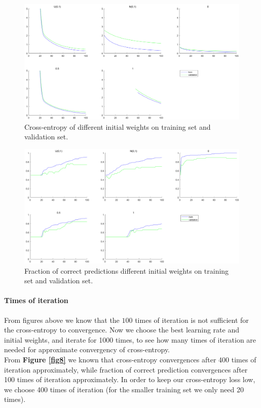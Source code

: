 \documentclass{article}
\begin{document}
\begin{figure}[H]
	\centering
	\includegraphics[scale=0.4]{figure6}
	\caption{Cross-entropy of different initial weights on training set and validation set.}
	\label{fig6}
\end{figure}

\begin{figure}[H]
	\centering
	\includegraphics[scale=0.4]{figure7}
	\caption{Fraction of correct predictions different initial weights on training set and validation set.}
	\label{fig7}
\end{figure}

\paragraph{Times of iteration}
From figures above we know that the $100$ times of iteration is not sufficient for the cross-entropy to convergence. Now we choose the best learning rate and initial weights, and iterate for 1000 times, to see how many times of iteration are needed for approximate convergency of cross-entropy.\\

From \textbf{Figure \ref{fig8}} we known that cross-entropy convergences after 400 times of iteration approximately, while fraction of correct prediction convergences after 100 times of iteration approximately. In order to keep our cross-entropy loss low, we choose 400 times of iteration (for the smaller training set we only need 20 times). 
\end{document}
